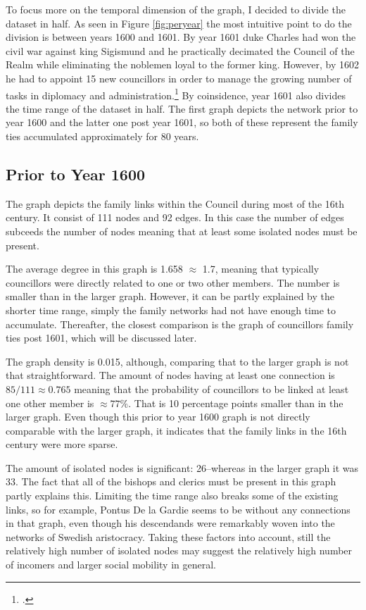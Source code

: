 To focus more on the temporal dimension of the graph, I decided to divide the dataset in half. As seen in Figure \ref{fig:peryear} the most intuitive point to do the division is between years 1600 and 1601. By year 1601 duke Charles had won the civil war against king Sigismund and he practically decimated the Council of the Realm while eliminating the noblemen loyal to the former king. However, by 1602 he had to appoint 15 new councillors in order to manage the growing number of tasks in diplomacy and administration.\footcite[TODO]{pSuurvalta} By coinsidence, year 1601 also divides the time range of the dataset in half. The first graph depicts the network prior to year 1600 and the latter one post year 1601, so both of these represent the family ties accumulated approximately for 80 years.

\subsection{Prior to Year 1600}
The graph depicts the family links within the Council during most of the 16th century. It consist of 111 nodes and 92 edges. In this case the number of edges subceeds the number of nodes meaning that at least some isolated nodes must be present. 

The average degree in this graph is 1.658 $\approx$ 1.7, meaning that typically councillors were directly related to one or two other members. The number is smaller than in the larger graph. However, it can be partly explained by the shorter time range, simply the family networks had not have enough time to accumulate. Thereafter, the closest comparison is the graph of councillors family ties post 1601, which will be discussed later.

The graph density is 0.015, although, comparing that to the larger graph is not that straightforward. The amount of nodes having at least one connection is $85/111 \approx 0.765$ meaning that the probability of councillors to be linked at least one other member is $\approx 77\%$. That is 10 percentage points smaller than in the larger graph. Even though this prior to year 1600 graph is not directly comparable with the larger graph, it indicates that the family links in the 16th century were more sparse.

The amount of isolated nodes is significant: 26–whereas in the larger graph it was 33. The fact that all of the bishops and clerics must be present in this graph partly explains this. Limiting the time range also breaks some of the existing links, so for example, Pontus De la Gardie seems to be without any connections in that graph, even though his descendands were remarkably woven into the networks of Swedish aristocracy. Taking these factors into account, still the relatively high number of isolated nodes may suggest the relatively high number of incomers and larger social mobility in general.

